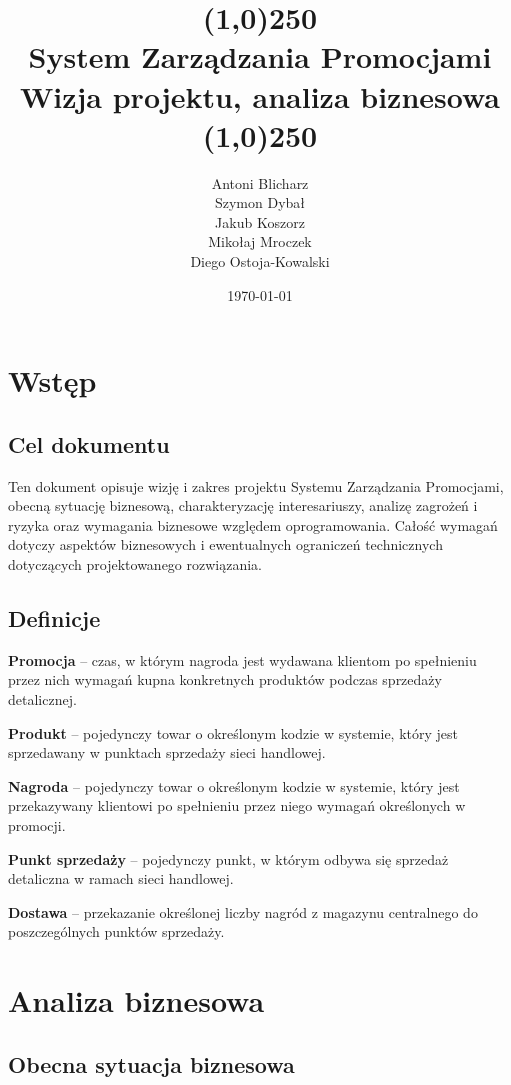 \documentclass[a4paper,12pt]{article}
\title{
    \line(1,0){250}\\
    System Zarządzania Promocjami\\
    Wizja projektu, analiza biznesowa\\
    \line(1,0){250}}
\author{Antoni Blicharz\\
        Szymon Dybał\\
        Jakub Koszorz\\
        Mikołaj Mroczek\\
        Diego Ostoja-Kowalski\\}
\date{\today}
\begin{document}
\begin{titlepage}
    \maketitle
\end{titlepage}

\newpage

\section{Wstęp}

\subsection{Cel dokumentu}

Ten dokument opisuje wizję i zakres projektu Systemu Zarządzania Promocjami, obecną sytuację biznesową, charakteryzację interesariuszy, analizę zagrożeń i ryzyka oraz wymagania biznesowe względem oprogramowania.
Całość wymagań dotyczy aspektów biznesowych i ewentualnych ograniczeń technicznych dotyczących projektowanego rozwiązania.

\subsection{Definicje}

\textbf{Promocja} -- czas, w którym nagroda jest wydawana klientom po spełnieniu przez nich wymagań kupna konkretnych produktów podczas sprzedaży detalicznej.

\textbf{Produkt} -- pojedynczy towar o określonym kodzie w systemie, który jest sprzedawany w punktach sprzedaży sieci handlowej.

\textbf{Nagroda} -- pojedynczy towar o określonym kodzie w systemie, który jest przekazywany klientowi po spełnieniu przez niego wymagań określonych w promocji.

\textbf{Punkt sprzedaży} -- pojedynczy punkt, w którym odbywa się sprzedaż detaliczna w ramach sieci handlowej.

\textbf{Dostawa} -- przekazanie określonej liczby nagród z magazynu centralnego do poszczególnych punktów sprzedaży.

\section{Analiza biznesowa}

\subsection{Obecna sytuacja biznesowa}
\end{document}
